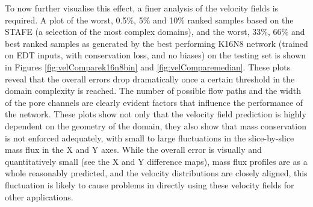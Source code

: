 \documentclass{article}
\begin{document}
To now further visualise this effect, a finer analysis of the velocity fields is required. A plot of the worst, 0.5\%, 5\% and 10\% ranked samples based on the STAFE (a selection of the most complex domains), and the worst, 33\%, 66\% and best ranked samples as generated by the best performing K16N8 network (trained on EDT inputs, with conservation loss, and no biases) on the testing set is shown in Figures \ref{fig:velComparek16n8bin} and \ref{fig:velComparemedian}. These plots reveal that the overall errors drop dramatically once a certain threshold in the domain complexity is reached. The number of possible flow paths and the width of the pore channels are clearly evident factors that influence the performance of the network. These plots show not only that the velocity field prediction is highly dependent on the geometry of the domain, they also show that mass conservation is not enforced adequately, with small to large fluctuations in the slice-by-slice mass flux in the X and Y axes. While the overall error is visually and quantitatively small (see the X and Y difference maps), mass flux profiles are as a whole reasonably predicted, and the velocity distributions are closely aligned, this fluctuation is likely to cause problems in directly using these velocity fields for other applications. 
\end{document}
